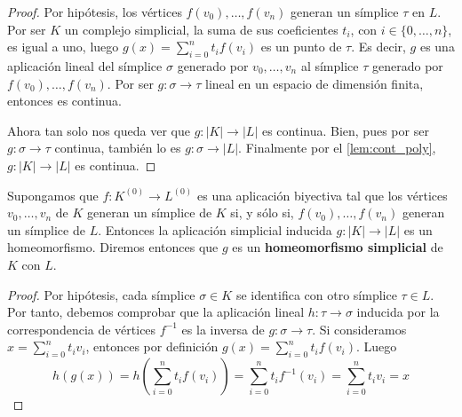 \begin{proof}
	Por hipótesis, los vértices \(f(v_{0}), \ldots, f(v_{n})\) generan un símplice
	\(\tau\) en \(L\). Por ser \(K\) un complejo simplicial, la suma de sus coeficientes
	\(t_{i}\), con \(i \in \{0, \ldots, n\}\), es igual a uno, luego \(g(x) = \sum_{i=0}^{n}
	t_{i}f(v_{i})\) es un punto de \(\tau\). Es decir, \(g\) es una aplicación lineal del
	símplice \(\sigma\) generado por \(v_{0}, \ldots, v_{n}\) al símplice \(\tau\) generado
	por \(f(v_{0}), \ldots, f(v_{n})\). Por ser \(g: \sigma \rightarrow \tau\) lineal
	en un espacio de dimensión finita, entonces es continua.

	Ahora tan solo nos queda ver que \(g:|K| \rightarrow |L|\) es continua. Bien, pues
	por ser \(g: \sigma \rightarrow \tau\) continua, también lo es
	\(g: \sigma \rightarrow |L|\). Finalmente por el \autoref{lem:cont_poly},
	\(g:|K| \rightarrow |L|\) es continua.
\end{proof}

\begin{lema}
	\label{lem:homeo_complex} Supongamos que \(f:K^{(0)}\rightarrow L^{(0)}\) es una
	aplicación biyectiva tal que los vértices \(v_{0}, \ldots, v_{n}\) de \(K\) generan
	un símplice de \(K\) si, y sólo si, \(f(v_{0}), \ldots, f(v_{n})\) generan un símplice
	de \(L\). Entonces la aplicación simplicial inducida \(g:|K| \rightarrow |L|\) es
	un homeomorfismo. Diremos entonces que \(g\) es un \textbf{homeomorfismo
	simplicial} de \(K\) con \(L\).
\end{lema}

\begin{proof}
	Por hipótesis, cada símplice \(\sigma \in K\) se identifica con otro símplice
	\(\tau \in L\). Por tanto, debemos comprobar que la aplicación lineal
	\(h: \tau \rightarrow \sigma\) inducida por la correspondencia de vértices
	\(f^{-1}\) es la inversa de \(g: \sigma \rightarrow \tau\). Si consideramos \(x = \sum
	_{i=0}^{n}t_{i}v_{i}\), entonces por definición
	\(g(x) = \sum_{i=0}^{n}t_{i}f(v_{i})\). Luego
	\[
		h(g(x)) = h(\sum_{i=0}^{n}t_{i}f(v_{i})) = \sum_{i=0}^{n}t_{i}f^{-1}(v_{i}) =
		\sum_{i=0}^{n}t_{i}v_{i}= x
	\]
\end{proof}

